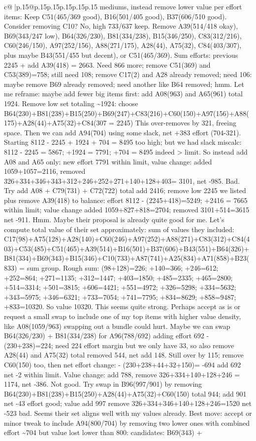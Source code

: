 \documentclass{article}
\begin{document}
{\begin{supertabular}{c@{$\;$}|p{.15\linewidth}@{}p{.15\linewidth}p{.15\linewidth}p{.15\linewidth}p{.15\linewidth}p{.15\linewidth}}
{{{mediums, instead remove lower value per effort items: Keep C51(465/369 good), B16(501/405 good), B37(606/510 good). Consider removing C10? No, high 733/637 keep. Remove A39(514/418 okay), B69(343/247 low), B64(326/230), B81(334/238), B15(346/250), C83(312/216), C60(246/150), A97(252/156), A88(271/175), A28(44), A75(32), C84(403/307), plus maybe B43(551/455 but decent), or C51(465/369). Sum efforts: previous 2245 + add A39(418) = 2663. Need 866 more; remove C51(369) and C53(389)=758; still need 108; remove C17(2) and A28 already removed; need 106: maybe remove B69 already removed; need another like B64 removed; hmm. Let me reframe: maybe add fewer big items first: add A08(963) and A65(961) total 1924. Remove low set totaling \textasciitilde{}1924: choose B64(230)+B81(238)+B15(250)+B69(247)+C83(216)+C60(150)+A97(156)+A88(175)+A28(44)+A75(32)+C84(307 = 2245) This over{-}removes by 321, freeing space. Then we can add A94(704) using some slack, net +383 effort (704{-}321). Starting 8112 {-} 2245 + 1924 + 704 = 8495 too high; but we had slack miscalc: 8112 {-} 2245 = 5867; +1924 = 7791; +704 = 8495 indeed > limit. So instead add A08 and A65 only: new effort 7791 within limit, value change: added 1059+1057=2116, removed 326+334+346+343+312+246+252+271+140+128+403= 3101, net {-}985. Bad. Try add A08 + C79(731) + C72(722) total add 2416; remove low 2245 we listed plus remove A39(418) to balance: effort 8112 {-} (2245+418)=5249; +2416 = 7665 within limit; value change added 1059+827+818=2704; removed 3101+514=3615 net {-}911. Hmm. Maybe their proposal is already quite good for me. Let’s compute total value of their set approximately: sum of values they included: C17(98)+A75(128)+A28(140)+C60(246)+A97(252)+A88(271)+C83(312)+C84(403)+C53(485)+C51(465)+A39(514)+B16(501)+B37(606)+B43(551)+B64(326)+B81(334)+B69(343)+B15(346)+C10(733)+A87(741)+A25(834)+A71(858)+B23(833) = sum group. Rough sum: (98+128)=226; +140=366; +246=612; +252=864; +271=1135; +312=1447; +403=1850; +485=2335; +465=2800; +514=3314; +501=3815; +606=4421; +551=4972; +326=5298; +334=5632; +343=5975; +346=6321; +733=7054; +741=7795; +834=8629; +858=9487; +833=10320. So value 10320. This seems quite strong. Perhaps accept as is or request a small swap to include one of my top items with higher value density, like A08(1059/963) swapping out a bundle could hurt. Maybe we can swap B64(326/230) + B81(334/238) for A96(788/692) adding effort 692 {-} (230+238)=224; need 224 effort margin but we only have 33, so also remove A28(44) and A75(32) total removed 544, net add 148. Still over by 115; remove C60(150) too, then net effort change: {-} (230+238+44+32+150)= {-}694 add 692 net {-}2 within limit. Value change: add 788, remove 326+334+140+128+246 = 1174, net {-}386. Not good. Try swap in B96(997/901) by removing B64(230)+B81(238)+B15(250)+A28(44)+A75(32)+C60(150) total 944; add 901 net {-}43 effort good; value add 997 remove 326+334+346+140+128+246=1520 net {-}523 bad. Seems their set aligns well with my values already. Best move: accept or minor tweak to include A94(800/704) by removing two lower ones with combined effort \textasciitilde{}704 but value lost lower than 800: candidates: B69(343) + }}}
\end{supertabular}}
\end{document}
